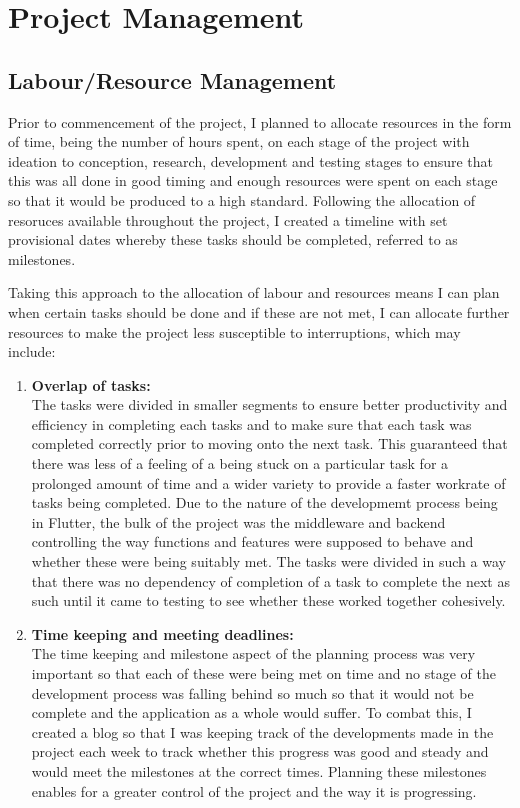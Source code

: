 \documentclass{report}
\begin{document}
\chapter{Project Management}

	\section{Labour/Resource Management}
Prior to commencement of the project, I planned to allocate resources in the form of time, being the number of hours spent, on each stage of the project with ideation to conception, research, development and testing stages to ensure that this was all done in good timing and enough resources were spent on each stage so that it would be produced to a high standard. Following the allocation of resoruces available throughout the project, I created a timeline with set provisional dates whereby these tasks should be completed, referred to as milestones.

Taking this approach to the allocation of labour and resources means I can plan when certain tasks should be done and if these are not met, I can allocate further resources to make the project less susceptible to interruptions, which may include:

\begin{enumerate}
\item \textbf{Overlap of tasks:}\\
The tasks were divided in smaller segments to ensure better productivity and efficiency in completing each tasks and to make sure that each task was completed correctly prior to moving onto the next task. This guaranteed that there was less of a feeling of a being stuck on a particular task for a prolonged amount of time and a wider variety to provide a faster workrate of tasks being completed. Due to the nature of the developmemt process being in Flutter, the bulk of the project was the middleware and backend controlling the way functions and features were supposed to behave and whether these were being suitably met. The tasks were divided in such a way that there was no dependency of completion of a task to complete the next as such until it came to testing to see whether these worked together cohesively.
\item \textbf{Time keeping and meeting deadlines:}\\
The time keeping and milestone aspect of the planning process was very important so that each of these were being met on time and no stage of the development process was falling behind so much so that it would not be complete and the application as a whole would suffer. To combat this, I created a blog so that I was keeping track of the developments made in the project each week to track whether this progress was good and steady and would meet the milestones at the correct times. Planning these milestones enables for a greater control of the project and the way it is progressing.
\end{enumerate}
\end{document}
